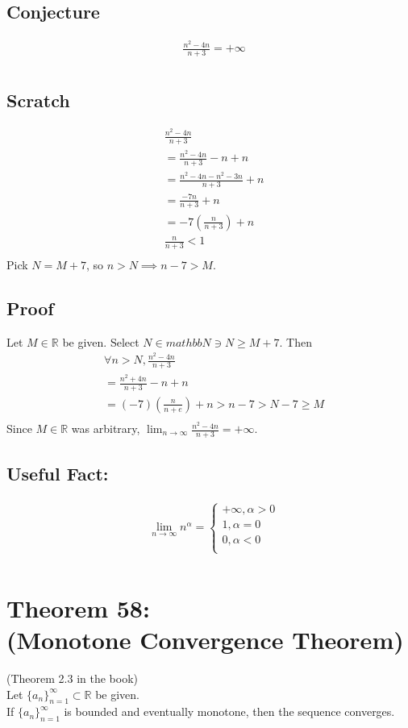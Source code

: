 \documentclass{article}
\begin{document}
\subsection{Conjecture}
\begin{align*}
 	& \frac{n^2 - 4n}{n + 3} = +\infty \\
\end{align*}
\subsection{Scratch}
\begin{align*}
 	& \frac{n^2 - 4n}{n + 3} \\
 	& = \frac{n^2 - 4n}{n + 3} - n + n \\
 	& = \frac{n^2 - 4n - n^2 - 3n}{n+3} + n \\
 	& = \frac{-7n}{n + 3} + n \\
 	& = -7 (\frac{n}{n + 3}) + n \\
 	& \frac{n}{n + 3} < 1 \\
\end{align*}
Pick $N = M + 7$, so $n > N \implies n - 7 > M$.
\subsection{Proof}
Let $M \in \mathbb{R}$ be given. Select $N \in mathbb{N} \ni N \geq M + 7$. Then
\begin{align*}
 	& \forall n > N, \frac{n^2 - 4n}{n + 3} \\
 	&  = \frac{n^2 + 4n}{n + 3} - n + n \\
 	& = (-7)(\frac{n}{n+e}) + n > n - 7 > N - 7 \geq M \\
\end{align*}
Since $M \in \mathbb{R}$ was arbitrary, $\lim_{n \rightarrow \infty} \frac{n^2 - 4n}{n+3} = +\infty$.
\subsection{Useful Fact:}
\begin{align*}
 	& \lim_{n \rightarrow \infty} n^\alpha = \begin{cases} +\infty, \alpha > 0\\
 	1, \alpha = 0\\
 	0, \alpha < 0\\
 	\end{cases}\\
\end{align*}
\section{Theorem 58: \\(Monotone Convergence Theorem)}
(Theorem 2.3 in the book)\\
Let $\{ a_n \}_{n = 1}^\infty \subset \mathbb{R}$ be given. \\ If $ \{ a_n \}_{n = 1}^\infty$ is bounded and eventually monotone, then the sequence converges.
\end{document}
